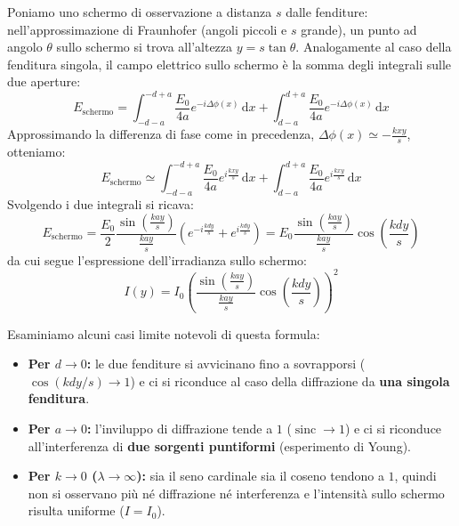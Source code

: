 \documentclass[openany,a4paper,12pt]{book}
\begin{document}
\begin{figure}[H]
\end{figure}

Poniamo uno schermo di osservazione a distanza $s$ dalle fenditure: nell'approssimazione di Fraunhofer (angoli piccoli e $s$ grande), un punto ad angolo $\theta$ sullo schermo si trova all'altezza $y = s\tan\theta$. Analogamente al caso della fenditura singola, il campo elettrico sullo schermo è la somma degli integrali sulle due aperture:
\[
    E_{\text{schermo}} = \int_{-d-a}^{-d+a} \frac{E_0}{4a} e^{-i \Delta\phi(x)} \,\mathrm{d}x + \int_{d-a}^{d+a} \frac{E_0}{4a} e^{-i \Delta\phi(x)} \,\mathrm{d}x
\]
Approssimando la differenza di fase come in precedenza, $\Delta\phi(x) \simeq -\frac{k x y}{s}$, otteniamo:
\[
    E_{\text{schermo}} \simeq \int_{-d-a}^{-d+a} \frac{E_0}{4a} e^{i\frac{k x y}{s}} \,\mathrm{d}x + \int_{d-a}^{d+a} \frac{E_0}{4a} e^{i\frac{k x y}{s}} \,\mathrm{d}x
\]
Svolgendo i due integrali si ricava:
\[
    E_{\text{schermo}} = \frac{E_0}{2} \frac{\sin\left(\frac{k a y}{s}\right)}{\frac{k a y}{s}} \left(e^{-i\frac{k d y}{s}} + e^{i\frac{k d y}{s}}\right) = E_0 \frac{\sin\left(\frac{k a y}{s}\right)}{\frac{k a y}{s}} \cos\left(\frac{k d y}{s}\right)
\]
da cui segue l'espressione dell'irradianza sullo schermo:
\[
    I(y) = I_0 \left(\frac{\sin\left(\frac{k a y}{s}\right)}{\frac{k a y}{s}} \cos\left(\frac{k d y}{s}\right)\right)^2
\]

Esaminiamo alcuni casi limite notevoli di questa formula:
\begin{itemize}
    \item \textbf{Per $d \to 0$:} le due fenditure si avvicinano fino a sovrapporsi ($\cos(kdy/s) \to 1$) e ci si riconduce al caso della diffrazione da \textbf{una singola fenditura}.
    \item \textbf{Per $a \to 0$:} l'inviluppo di diffrazione tende a $1$ ($\operatorname{sinc} \to 1$) e ci si riconduce all'interferenza di \textbf{due sorgenti puntiformi} (esperimento di Young).
    \item \textbf{Per $k \to 0$ ($\lambda \to \infty$):} sia il seno cardinale sia il coseno tendono a $1$, quindi non si osservano più né diffrazione né interferenza e l'intensità sullo schermo risulta uniforme ($I = I_0$).
\end{itemize}
\end{document}
